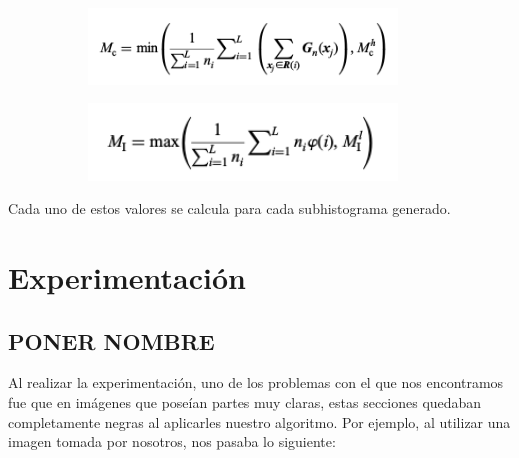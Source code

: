 \documentclass[10pt, a4paper]{article}
\begin{document}
\begin{figure}[H]
	\centering
    \begin{subfigure}{0.5\textwidth}
        \includegraphics[width=0.9\textwidth]{calculo-Mc.png}
    \end{subfigure}\hfill
    \begin{subfigure}{0.5\textwidth}
        \includegraphics[width=0.9\textwidth]{calculo_Mi.png}
    \end{subfigure}\hfill
\end{figure}

Cada uno de estos valores se calcula para cada subhistograma generado.

\section{Experimentación}

\subsection{PONER NOMBRE}

Al realizar la experimentación, uno de los problemas con el que nos encontramos fue que en imágenes que poseían partes muy claras, estas secciones quedaban completamente negras al aplicarles nuestro algoritmo.  Por ejemplo, al utilizar una imagen tomada por nosotros, nos pasaba lo siguiente:
\end{document}
